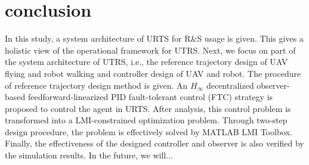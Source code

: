 \documentclass{ieeeaccess}
\begin{document}
\section{conclusion}
In this study, a system architecture of URTS for R\&S usage is given. This gives a holistic view of the operational framework for UTRS. Next, we focus on part of the system architecture of UTRS, i.e., the reference trajectory design of UAV flying and robot walking and controller design of UAV and robot. The procedure of reference trajectory design method is given. An $H_\infty$ decentralized observer-based feedforward-linearized PID fault-tolerant control (FTC) strategy is proposed to control the agent in URTS. After analysis, this control problem is transformed into a LMI-constrained optimization problem. Through two-step design procedure, the problem is effectively solved by MATLAB LMI Toolbox. Finally, the effectiveness of the designed controller and observer is also verified by the simulation results. In the future, we will...





\EOD
\end{document}
